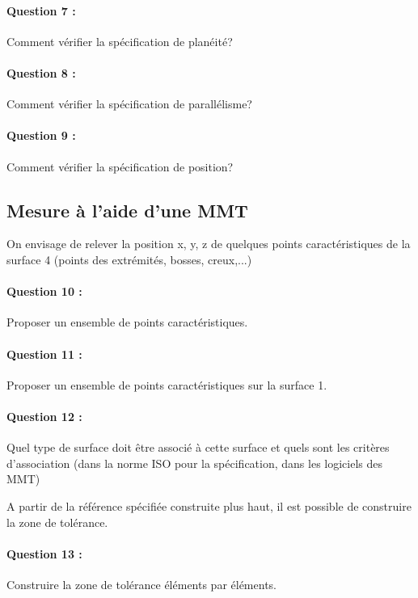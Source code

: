 \paragraph{Question 7 :} Comment vérifier la spécification de planéité?

\paragraph{Question 8 :} Comment vérifier la spécification de parallélisme?

\paragraph{Question 9 :} Comment vérifier la spécification de position?

\subsection{Mesure à l'aide d'une MMT}

On envisage de relever la position {x, y, z} de quelques points caractéristiques de la surface 4 (points des extrémités, bosses, creux,...)

\paragraph{Question 10 :} Proposer un ensemble de points caractéristiques.

\paragraph{Question 11 :} Proposer un ensemble de points caractéristiques sur la surface 1.

\paragraph{Question 12 :} Quel type de surface doit être associé à cette surface et quels sont les critères d'association (dans la norme ISO pour la spécification, dans les logiciels des MMT)

A partir de la référence spécifiée construite plus haut, il est possible de construire la zone de tolérance.

\paragraph{Question 13 :} Construire la zone de tolérance éléments par éléments.

